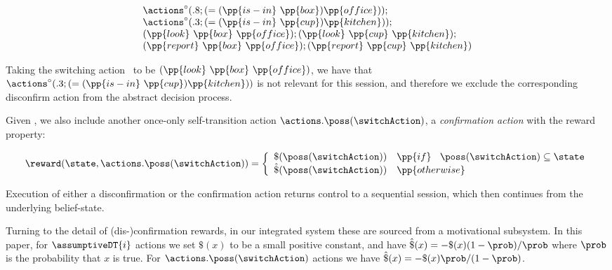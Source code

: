 \small
\[
\begin{array}{l}
\actions^{\circ}(.8;(=(\pp{is-in}~\pp{box})\pp{office}));\\
\actions^{\circ}(.3;(=(\pp{is-in}~\pp{cup})\pp{kitchen}));\\
(\pp{look}~\pp{box}~\pp{office});
(\pp{look}~\pp{cup}~\pp{kitchen});\\
(\pp{report}~\pp{box}~\pp{office}); 
(\pp{report}~\pp{cup}~\pp{kitchen})
\end{array}
\]
\normalsize

\noindent Taking the switching action \switchAction\ to be
$(\pp{look}~\pp{box}~\pp{office})$, we have that
$\actions^{\circ}(.3;(=(\pp{is-in}~\pp{cup})\pp{kitchen}))$ is not
relevant for this session, and therefore we exclude the corresponding
disconfirm action from the abstract decision process.

Given \switchAction, we also include another once-only self-transition
action $\actions.\poss(\switchAction)$, a \emph{confirmation action}
with the reward property:

\[
\reward(\state, \actions.\poss(\switchAction)) = \bigg\{ \begin{array}{ll}
\$(\poss(\switchAction)) & \pp{if}~\;\; \poss(\switchAction) \subseteq \state \\
\hat\$(\poss(\switchAction)) & \pp{otherwise} \\
\end{array}
\]

Execution of either a disconfirmation or the confirmation action
returns control to a sequential session, which then continues from the
underlying belief-state.

Turning to the detail of (dis-)confirmation rewards, in our integrated
system these are sourced from a motivational subsystem. In this paper,
for $\assumptiveDT{i}$ actions we set $\$(x)$ to be a small positive
constant, and have $\hat\$(x)= - \$(x)(1 - \prob) /
\prob$ where $\prob$ is the probability that $x$ is true. For
$\actions.\poss(\switchAction)$ actions we have $\hat\$(x)= -
\$(x)\prob/(1-\prob)$.






